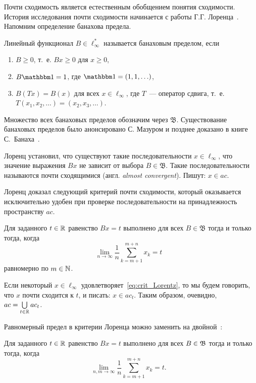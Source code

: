 Почти сходимость является естественным обобщением понятия сходимости.
История исследования почти сходимости начинается с работы Г.Г. Лоренца~\cite{lorentz1948contribution}.
Напомним определение банахова предела.

\begin{definition}
	Линейный функционал $B\in \ell_\infty^*$ называется банаховым пределом,
	если
	\begin{enumerate}
		\item
			$B\geq0$, т.~е. $Bx \geq 0$ для $x \geq 0$,
		\item
			$B\one=1$, где $\one =(1,1,\ldots)$,
		\item
			$B(Tx)=B(x)$ для всех $x\in \ell_\infty$, где $T$~---
		оператор сдвига, т.~е. $T(x_1,x_2,\ldots)=(x_2,x_3,\ldots)$.
	\end{enumerate}
\end{definition}
Множество всех банаховых пределов обозначим через $\mathfrak{B}$.
Существование банаховых пределов было анонсировано С. Мазуром \cite{Mazur} и позднее доказано в книге С.~Банаха~\cite{B}.


Лоренц установил, что существуют такие последовательности $x\in\ell_\infty$,
что значение выражения $Bx$ не зависит от выбора $B\in\mathfrak{B}$.
Такие последовательности называются почти сходящимися (англ. \textit{almost convergent}).
Пишут: $x\in ac$.

Лоренц доказал следующий критерий почти сходимости,
который оказывается исключительно удобен при проверке последовательности на принадлежность пространству $ac$.

\begin{theorem}
	Для заданного $t\in\mathbb{R}$ равенство $Bx=t$ выполнено для всех $B\in\mathfrak{B}$
	тогда и только тогда, когда
	\begin{equation}
		\label{eq:crit_Lorentz}
		\lim_{n\to\infty} \frac{1}{n} \sum_{k=m+1}^{m+n} x_k = t
	\end{equation}
	равномерно по $m\in\mathbb{N}$.
\end{theorem}

Если некоторый $x\in\ell_\infty$ удовлетворяет~\eqref{eq:crit_Lorentz},
то мы будем говорить, что $x$ почти сходится к $t$,
и писать: $x\in ac_t$.
Таким образом, очевидно, $ac = \bigcup\limits_{t\in\mathbb{R}} ac_t$.

Равномерный предел в критерии Лоренца можно заменить на двойной~\cite[Теорема 1]{zvol2022ac}:
\begin{theorem}
	Для заданного $t\in\mathbb{R}$ равенство $Bx=t$ выполнено для всех $B\in\mathfrak{B}$
	тогда и только тогда, когда
	\begin{equation}
		\label{eq:crit_Lorentz}
		\lim_{n,m\to\infty} \frac{1}{n} \sum_{k=m+1}^{m+n} x_k = t
		.
	\end{equation}
\end{theorem}

